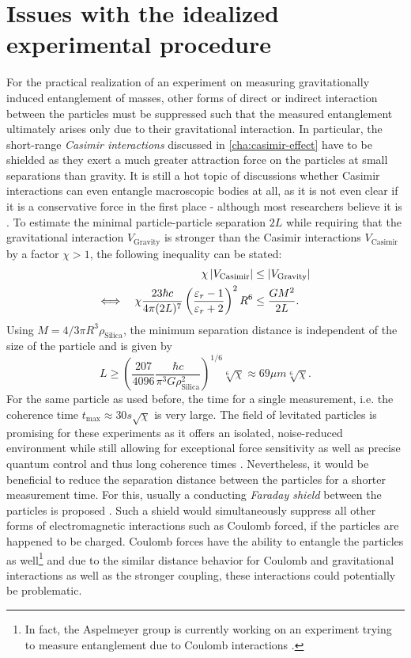 \section{Issues with the idealized experimental procedure}\label{sec:2:experimental-problems}

For the practical realization of an experiment on measuring gravitationally induced entanglement of masses, other forms of direct or indirect interaction between the particles must be suppressed such that the measured entanglement ultimately arises only due to their gravitational interaction.
In particular, the short-range \emph{Casimir interactions} \cite{Casimir_1948} discussed in \cref{cha:casimir-effect} have to be shielded as they exert a much greater attraction force on the particles at small separations than gravity.
It is still a hot topic of discussions whether Casimir interactions can even entangle macroscopic bodies at all, as it is not even clear if it is a conservative force in the first place - although most researchers believe it is \cite{DeBiase_2012,Yi_2023}.
To estimate the minimal particle-particle separation $2L$ while requiring that the gravitational interaction $V_\mathrm{Gravity}$ is stronger than the Casimir interactions $V_\mathrm{Casimir}$ \cite{Emig_2007} by a factor $\chi > 1$, the following inequality can be stated:
\begin{align}
  \chi \left\lvert V_\mathrm{Casimir}\right\rvert &\leq \left\lvert V_\mathrm{Gravity}\right\rvert \\
  \Longleftrightarrow \quad \chi \frac{23 \hbar c}{4 \pi (2L)^7} \left(\frac{\varepsilon_r - 1}{\varepsilon_r + 2}\right)^2 R^6 &\leq  \frac{G M^2}{2L} .
\end{align}
Using $M = 4/3 \pi R^3\rho_\mathrm{Silica}$, the minimum separation distance is independent of the size of the particle and is given by
\begin{equation}
  L \geq \left(\frac{207}{4096} \frac{\hbar c}{\pi^3 G \rho_\mathrm{Silica}^2}\right)^{1/6} \sqrt[6]{\chi} \approx 69\si{\mu m} \sqrt[6]{\chi} .
\end{equation}
For the same particle as used before, the time for a single measurement, i.e. the coherence time $t_\mathrm{max} \approx 30\si{s} \sqrt{\chi}$ is very large.
The field of levitated particles is promising for these experiments as it offers an isolated, noise-reduced environment while still allowing for exceptional force sensitivity as well as precise quantum control and thus long coherence times \cite{Aspelmeyer_2024,GonzalezBallestero_2021}.
Nevertheless, it would be beneficial to reduce the separation distance between the particles for a shorter measurement time.
For this, usually a conducting \emph{Faraday shield} between the particles is proposed \cite{Kamp_2020}.
Such a shield would simultaneously suppress all other forms of electromagnetic interactions such as Coulomb forced, if the particles are happened to be charged.
Coulomb forces have the ability to entangle the particles as well\footnote{In fact, the Aspelmeyer group is currently working on an experiment trying to measure entanglement due to Coulomb interactions \cite{Rudolph_2022}.} and due to the similar distance behavior for Coulomb and gravitational interactions as well as the stronger coupling, these interactions could potentially be problematic.


